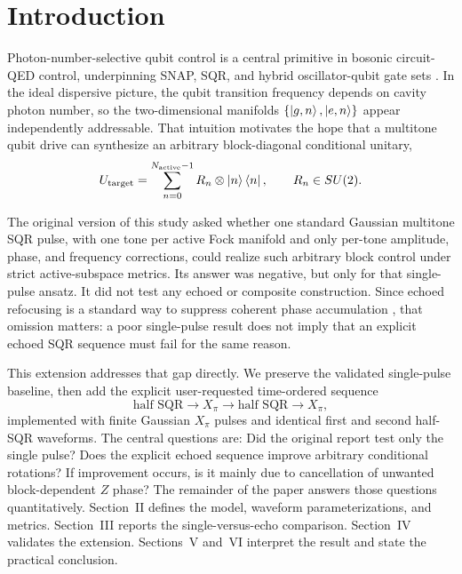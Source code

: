 \documentclass[aps,pra,twocolumn,reprint,floatfix,amsmath,amssymb]{revtex4-2}
\begin{document}
\maketitle

\section{Introduction}
Photon-number-selective qubit control is a central primitive in bosonic circuit-QED control, underpinning SNAP, SQR, and hybrid oscillator-qubit gate sets \cite{blais2021cqed,krastanov2015universal,heeres2015snap,heeres2017logical,eickbusch2022fast}. In the ideal dispersive picture, the qubit transition frequency depends on cavity photon number, so the two-dimensional manifolds \(\{\ket{g,n},\ket{e,n}\}\) appear independently addressable. That intuition motivates the hope that a multitone qubit drive can synthesize an arbitrary block-diagonal conditional unitary,
\[
U_{\mathrm{target}} = \sum_{n=0}^{N_{\mathrm{active}}-1} R_n \otimes \ket{n}\bra{n},
\qquad R_n \in SU(2).
\]

The original version of this study asked whether one standard Gaussian multitone SQR pulse, with one tone per active Fock manifold and only per-tone amplitude, phase, and frequency corrections, could realize such arbitrary block control under strict active-subspace metrics. Its answer was negative, but only for that single-pulse ansatz. It did not test any echoed or composite construction. Since echoed refocusing is a standard way to suppress coherent phase accumulation \cite{hahn1950echo}, that omission matters: a poor single-pulse result does not imply that an explicit echoed SQR sequence must fail for the same reason.

This extension addresses that gap directly. We preserve the validated single-pulse baseline, then add the explicit user-requested time-ordered sequence
\[
\text{half SQR} \rightarrow X_\pi \rightarrow \text{half SQR} \rightarrow X_\pi,
\]
implemented with finite Gaussian \(X_\pi\) pulses and identical first and second half-SQR waveforms. The central questions are: Did the original report test only the single pulse? Does the explicit echoed sequence improve arbitrary conditional rotations? If improvement occurs, is it mainly due to cancellation of unwanted block-dependent \(Z\) phase? The remainder of the paper answers those questions quantitatively. Section~II defines the model, waveform parameterizations, and metrics. Section~III reports the single-versus-echo comparison. Section~IV validates the extension. Sections~V and~VI interpret the result and state the practical conclusion.
\end{document}
